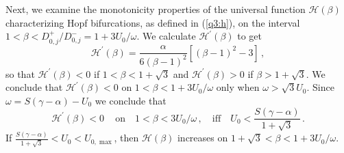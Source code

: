\documentclass{article}%
\newcommand{\dzjp}{D^{+}_{0,j}}
\newcommand{\dzjm}{D^{-}_{0,j}}
\begin{document}
Next, we examine the monotonicity properties of the universal function 
${\mathcal H}(\beta)$ characterizing Hopf bifurcations, as defined
in (\ref{q3:h}), on the interval $1<\beta<{\dzjp/\dzjm}=1+{3U_0/\omega}$.
We calculate ${\mathcal H}^{\prime}(\beta)$ to get
\begin{equation*}
   {\mathcal H}^{\prime}(\beta) = \frac{\alpha}{6 (\beta-1)^2} \left[
  (\beta-1)^2 -3 \right] \,,
\end{equation*}
so that ${\mathcal H}^{\prime}(\beta)<0$ if $1<\beta<1+\sqrt{3}$ and
${\mathcal H}^{\prime}(\beta)>0$ if $\beta>1+\sqrt{3}$. We conclude
that ${\mathcal H}^{\prime}(\beta)<0$ on $1<\beta<1+{3U_0/\omega}$ only
when $\omega>\sqrt{3}U_0$. Since $\omega=S(\gamma-\alpha)-U_0$ we conclude
that
\begin{equation}\label{q3:hmonot}
   {\mathcal H}^{\prime}(\beta)<0 \, \quad \mbox{on} \quad 1<\beta<{3U_0/\omega}
  \,, \quad \mbox{iff} \quad U_0 < \frac{S(\gamma-\alpha)}{1+\sqrt{3}} \,.
\end{equation}
If $\frac{S(\gamma-\alpha)}{1+\sqrt{3}}<U_0<U_{0,\max}$, then
${\mathcal H}(\beta)$ increases on $1+\sqrt{3}<\beta<1+{3U_0/\omega}$.
\end{document}

